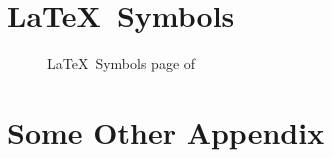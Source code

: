 \chapter{\LaTeX\ Symbols} \label{chap:LaTeX Symbols}

\def\MyAppendedPDF{latex_symbols.pdf} %
\setcounter{pages_of_my_pdf}{4} %
{
  \begin{figure}[htpb]
    \centering
    \caption{\LaTeX\ Symbols page  of }
    \label{fig:LaTeX Symbols page \arabic{current_page_of_my_pdf}}
  \end{figure}
}

\chapter{Some Other Appendix} \label{chap:Some Other Appendix}
\blindtext